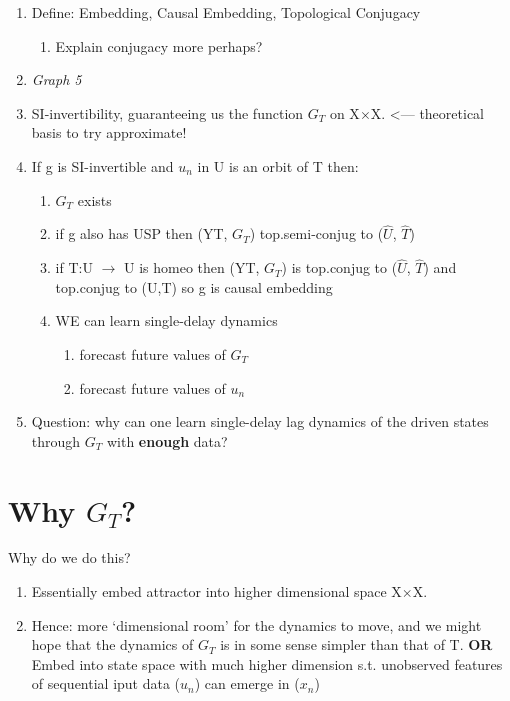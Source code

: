 \documentclass[12pt, oneside]{article}
\theoremstyle{definition}
\begin{document}
\begin{enumerate}
        \item Define: Embedding, Causal Embedding, Topological Conjugacy
        \begin{enumerate}
            \item Explain conjugacy more perhaps?  
        \end{enumerate}
        \item \emph{Graph 5}
        \item SI-invertibility, guaranteeing us the function $G_{T}$ on X$\times$X. <--- theoretical basis to try approximate!
        \item If g is SI-invertible and {$u_{n}$} in U is an orbit of T then:
        \begin{enumerate}
          \item   $G_{T}$ exists
          \item if g also has USP then (YT, $G_{T}$) top.semi-conjug to ($\hat{U}$, $\hat{T}$)
          \item if T:U $\rightarrow$ U is homeo then (YT, $G_{T}$) is top.conjug to ($\hat{U}$, $\hat{T}$) and top.conjug to (U,T) so g is causal embedding
          \item WE can learn single-delay dynamics
          \begin{enumerate}
            \item forecast future values of $G_{T}$
            \item forecast future values of $u_{n}$
          \end{enumerate}
        \end{enumerate}
        \item Question: why can one learn single-delay lag dynamics of the driven states through $G_{T}$
        with \textbf{enough} data?
\end{enumerate}


\section{Why $G_{T}$?} 

Why do we do this?

\begin{enumerate}
  \item Essentially embed attractor into higher dimensional space X$\times$X.
  \item  Hence: more `dimensional room' for the dynamics to move, and we might hope
  that the dynamics of $G_{T}$ is in some sense simpler than that of T.
  \newline \textbf{OR} 
  \newline  Embed into state space with much higher dimension s.t. unobserved features of sequential iput data ($u_{n}$) can emerge in ($x_{n}$)
\end{enumerate}
\end{document}
